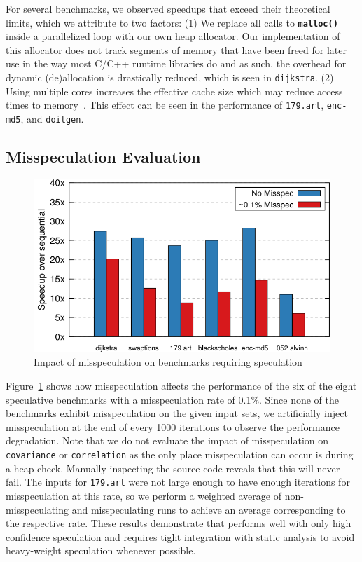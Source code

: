 For several benchmarks, we observed speedups that exceed their theoretical
limits, which we attribute to two factors:
(1) We replace all calls to \texttt{\textbf{malloc()}} inside a parallelized
loop with our own heap allocator. Our implementation of this allocator
does not track segments of memory that have been freed for later use in the
way most C/C++ runtime libraries do and as such, the overhead for dynamic
(de)allocation is drastically reduced, which is seen in \texttt{dijkstra}.
(2) Using multiple cores increases the effective cache size which may
reduce access times to memory~\cite{jeon:11:oopsla}. This effect can be
seen in the performance of \texttt{179.art}, \texttt{enc-md5}, and
\texttt{doitgen}.

\subsection{Misspeculation Evaluation}
\begin{figure}[htp]
  \includegraphics[width=\columnwidth]{figures/misspec-crop}
  \caption{Impact of misspeculation on benchmarks requiring speculation}
  \label{fig:misspec}
\end{figure}
Figure~\ref{fig:misspec} shows how misspeculation affects the
performance of the six of the eight speculative benchmarks with a misspeculation rate of
0.1\%.
Since none of the benchmarks exhibit misspeculation on the
given input sets, we artificially inject misspeculation at the end of
every 1000 iterations to observe the performance degradation.
Note that we do not evaluate the impact of misspeculation on \texttt{covariance}
or \texttt{correlation} as the only place misspeculation can occur is
during a heap check. Manually inspecting the source code reveals that this
will never fail.
The inputs for \texttt{179.art} were not large enough to have
enough iterations for misspeculation at this rate, so we perform a
weighted average of non-misspeculating and misspeculating runs to achieve
an average corresponding to the respective rate.
These results demonstrate that \name performs well with only high
confidence speculation and requires tight integration with static analysis
to avoid heavy-weight speculation whenever possible.

